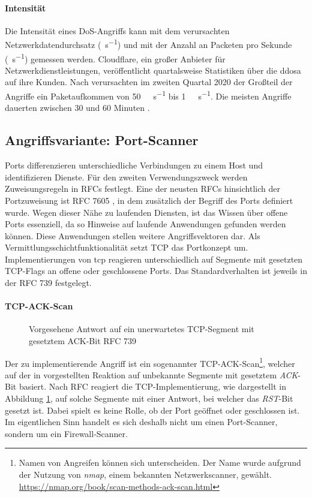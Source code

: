 \paragraph{Intensität} \label{sec:initensität}
Die Intensität eines DoS-Angriffs kann mit dem verursachten Netzwerkdatendurchsatz (\si{\byte\per\second}) und mit der Anzahl an Packeten pro Sekunde (\si{\packets\per\second}) gemessen werden. Cloudflare, ein großer Anbieter für Netzwerkdienstleistungen, veröffentlicht quartalsweise Statistiken über die \gls{ddosa} auf ihre Kunden. Nach  \cite{Yoachimik2020} verursachten im zweiten Quartal 2020 der Großteil der Angriffe ein Paketaufkommen von  \SI{50}{\kilo\packets\per\second} bis \SI{1}{\mega\packets\per\second}. Die meisten Angriffe dauerten zwischen 30 und 60 Minuten \cite{Yoachimik2020}.

\subsection{Angriffsvariante: Port-Scanner}
Ports differenzieren unterschiedliche Verbindungen zu einem Host und identifizieren Dienste. Für den zweiten Verwendungszweck werden Zuweisungsregeln in RFCs festlegt. Eine der neusten RFCs hinsichtlich der Portzuweisung ist RFC 7605 \autocite{RFC7605}, in dem zusätzlich der Begriff des Ports definiert wurde. Wegen dieser Nähe zu laufenden Diensten, ist das Wissen über offene Ports essenziell, da so Hinweise auf laufende Anwendungen gefunden werden können. Diese Anwendungen stellen weitere Angriffsvektoren dar. Als Vermittlungsschichtfunktionalität setzt TCP das Portkonzept um. Implementierungen von \gls{tcp} reagieren unterschiedlich auf Segmente mit gesetzten TCP-Flags an offene oder geschlossene Ports. Das Standardverhalten ist jeweils in der RFC 739 \cite{RFC0793} festgelegt.

\paragraph{TCP-ACK-Scan}
\begin{figure}[ht]
	\centering
	
	\caption{Vorgesehene Antwort auf ein unerwartetes TCP-Segment mit gesetztem ACK-Bit RFC 739 \cite{RFC0793}}
	\label{fig:baTCPAckAnswer}
\end{figure}
Der zu implementierende Angriff ist ein sogenannter TCP-ACK-Scan\footnote{Namen von Angreifen können sich unterscheiden. Der Name wurde aufgrund der Nutzung von \emph{nmap}, einem bekannten Netzwerkscanner, gewählt. \url{https://nmap.org/book/scan-methods-ack-scan.html}}, welcher auf der in  vorgestellten Reaktion auf unbekannte Segmente mit gesetztem \emph{ACK}-Bit basiert. Nach RFC reagiert die TCP-Implementierung, wie dargestellt in Abbildung \ref{fig:baTCPAckAnswer}, auf solche Segmente mit einer Antwort, bei welcher das \emph{RST}-Bit gesetzt ist. Dabei spielt es keine Rolle, ob der Port geöffnet oder geschlossen ist. Im eigentlichen Sinn handelt es sich deshalb nicht um einen Port-Scanner, sondern um ein Firewall-Scanner.

